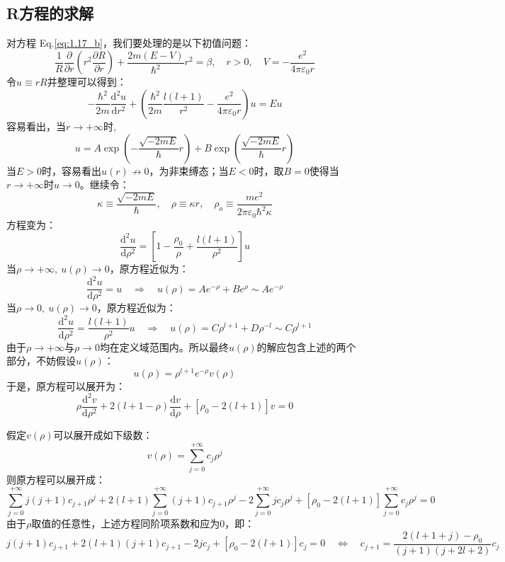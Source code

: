 \subsection{R方程的求解}
对方程 Eq.\eqref{eq:1.17_b}，我们要处理的是以下初值问题：
\[\frac{1}{R}\frac{\partial}{\partial{r}}(r^2\frac{\partial R}{\partial{r}})+\frac{2m(E-V)}{\hbar^2}r^2=\beta, \quad r>0, \quad V=-\frac{e^2}{4 \pi \varepsilon_0 r}\]
令$u \equiv rR$并整理可以得到：
\[-\frac{\hbar^2}{2m}\frac{\mathrm{d^2}u}{\mathrm{d}r^2}+ \left (\frac{\hbar^2}{2m}\frac{l(l+1)}{r^2}-\frac{e^2}{4 \pi \varepsilon_0r} \right )u=Eu\]
容易看出，当$r \rightarrow +\infty$时,
\[u=A\exp\left(-\frac{\sqrt{-2mE}}{\hbar}r\right)+B\exp\left(\frac{\sqrt{-2mE}}{\hbar}r\right)\]
当$E>0$时，容易看出$u(r)\nrightarrow0$，为非束缚态；当$E<0$时，取$B=0$使得当$r \rightarrow +\infty$时$u \rightarrow 0$。继续令：
\[\kappa \equiv \frac{\sqrt{-2mE}}{\hbar}, \quad \rho \equiv \kappa r, \quad \rho_o \equiv \frac{me^2}{2 \pi \varepsilon_0 \hbar^2 \kappa}\]
方程变为：
\[\frac{\mathrm{d^2}u}{\mathrm{d}\rho^2}=\left [ 1-\frac{\rho_0}{\rho}+\frac{l(l+1)}{\rho^2} \right ]u\]
当$\rho \rightarrow +\infty, \ u(\rho) \to 0$，原方程近似为：
\[\frac{\mathrm{d^2}u}{\mathrm{d}\rho^2}=u \quad \Rightarrow \quad u(\rho)=Ae^{-\rho}+Be^{\rho}\sim Ae^{-\rho}\]
当$\rho \rightarrow 0, \ u(\rho) \to 0$，原方程近似为：
\[\frac{\mathrm{d^2}u}{\mathrm{d}\rho^2}=\frac{l(l+1)}{\rho^2}u \quad \Rightarrow \quad u(\rho)=C\rho^{l+1}+D\rho^{-l} \sim C\rho^{l+1}\]
由于$\rho \rightarrow +\infty$与$\rho \rightarrow 0$均在定义域范围内。所以最终$u(\rho)$的解应包含上述的两个部分，不妨假设$u(\rho)$：
\[u(\rho)=\rho^{l+1}e^{-\rho}v(\rho)\]
于是，原方程可以展开为：
\[\rho\frac{\mathrm{d^2}v}{\mathrm{d}\rho^2} +2(l+1-\rho)\frac{\mathrm{d}v}{\mathrm{d}\rho}+[\rho_0-2(l+1)]v=0 \]

假定$v(\rho)$可以展开成如下级数：
\[v(\rho)=\sum_{j=0}^{+\infty}c_j\rho^j\]
则原方程可以展开成：
\[\sum_{j=0}^{+\infty}j(j+1)c_{j+1}\rho^j+2(l+1)\sum_{j=0}^{+\infty}(j+1)c_{j+1}\rho^j-2\sum_{j=0}^{+\infty}jc_j\rho^j+[\rho_0-2(l+1)]\sum_{j=0}^{+\infty}c_j\rho^j=0\]
由于$\rho$取值的任意性，上述方程同阶项系数和应为0，即：
\[j(j+1)c_{j+1}+2(l+1)(j+1)c_{j+1}-2jc_j+[\rho_0-2(l+1)]c_j=0 \quad \Leftrightarrow \quad c_{j+1}=\frac{2(l+1+j)-\rho_0}{(j+1)(j+2l+2)}c_j\]

